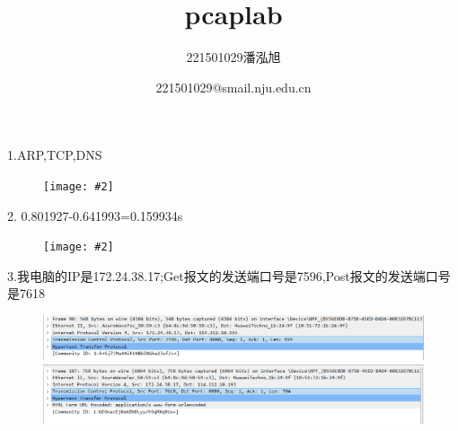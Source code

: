 \documentclass{article}
\newcommand{\tu}[2][width=\textwidth]{%
  \begin{figure}[htbp]
    \centering
    \texttt{[image: \#2]}
  \end{figure}
}
\begin{document}
\title{pcaplab}
\author{221501029潘泓旭}
\date{221501029@smail.nju.edu.cn}
\maketitle
\noindent
1.ARP,TCP,DNS\\
\tu{pic0/p1.png}

2. 0.801927-0.641993=0.159934s\\
\tu{pic0/p2.png}

3.我电脑的IP是172.24.38.17;Get报文的发送端口号是7596,Post报文的发送端口号是7618\\
\begin{figure}[htbp]
    \centering
    \includegraphics[width=1\textwidth]{pic0/p3.png} %
    \includegraphics[width=1\textwidth]{pic0/p4.png} %
\end{figure}
\end{document}
